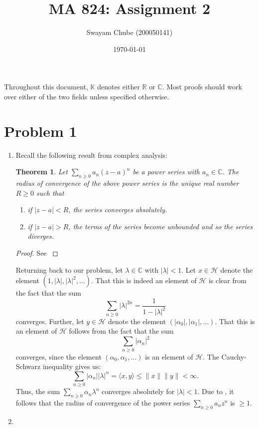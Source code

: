 \documentclass[10pt]{amsart}
\title{MA 824: Assignment 2}
\author{Swayam Chube (200050141)}
\date{\today}
\theoremstyle{thmstyle}
\newtheorem{theorem}{Theorem}[section]
\theoremstyle{defstyle}
\newcommand{\R}{\mathbb{R}}
\newcommand{\bbC}{\mathbb{C}}
\newcommand{\K}{\mathbb{K}}
\newcommand{\calH}{\mathcal{H}} %
\renewcommand{\le}{\leqslant}
\renewcommand{\ge}{\geqslant}
\begin{document}
\maketitle 

Throughout this document, $\K$ denotes either $\R$ or $\bbC$. Most proofs should work over either of the two fields unless specified otherwise.

\section{Problem 1}
\begin{enumerate}[label=(\alph*)]
\item Recall the following result from complex analysis: 
\begin{theorem}
    Let $\displaystyle\sum_{n\ge 0} a_n(z - a)^n$ be a power series with $a_n\in\bbC$. The radius of convergence of the above power series is the unique real number $R\ge 0$ such that
    \begin{enumerate}[label=(\roman*)]
        \item if $|z - a| < R$, the series converges absolutely. 
        \item if $|z - a| > R$, the terms of the series become unbounded and so the series diverges.
    \end{enumerate}
\end{theorem}
\begin{proof}
    See \cite[Theorem III.1.3]{conway-complex}
\end{proof}
Returning back to our problem, let $\lambda\in\bbC$ with $|\lambda| < 1$. Let $x\in\calH$ denote the element $(1,|\lambda|,|\lambda|^2,\dots)$. That this is indeed an element of $\calH$ is clear from the fact that the sum
\begin{equation*}
    \sum_{n\ge 0} |\lambda|^{2n} = \frac{1}{1 - |\lambda|^2}
\end{equation*}
converges. Further, let $y\in\calH$ denote the element $(|\alpha_0|,|\alpha_1|,\dots)$. That this is an element of $\calH$ follows from the fact that the sum 
\begin{equation*}
    \sum_{n\ge 0} |\alpha_n|^2
\end{equation*}
converges, since the element $(\alpha_0,\alpha_1,\dots)$ is an element of $\calH$. The Cauchy-Schwarz inequality gives us: 
\begin{equation*}
    \sum_{n\ge 0}|\alpha_n||\lambda|^n = \langle x, y\rangle\le\|x\|\|y\| < \infty.
\end{equation*}
Thus, the sum $\sum_{n\ge 0}\alpha_n\lambda^n$ converges absolutely for $|\lambda| < 1$. Due to , it follows that the radius of convergence of the power series $\sum_{n\ge 0}a_nz^n$ is $\ge 1$.

\item 
\end{enumerate}
\end{document}
